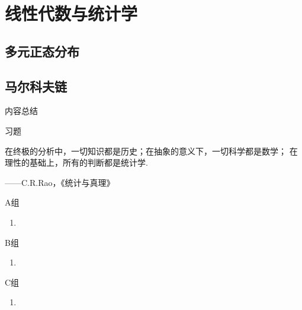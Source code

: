 \chapter{线性代数与统计学}

\section{多元正态分布}

\section{马尔科夫链}

\vspace{2ex}
\centerline{\heiti \Large 内容总结}

\vspace{2ex}

\centerline{\heiti \Large 习题}
\vspace{2ex}
{\kaishu 在终极的分析中，一切知识都是历史；在抽象的意义下，一切科学都是数学；
在理性的基础上，所有的判断都是统计学.}
\begin{flushright}
    \kaishu
    ——C.R.Rao，《统计与真理》
\end{flushright}
\centerline{\heiti A组}
\begin{enumerate}
    \item
\end{enumerate}
\centerline{\heiti B组}
\begin{enumerate}
    \item
\end{enumerate}
\centerline{\heiti C组}
\begin{enumerate}
    \item
\end{enumerate}
